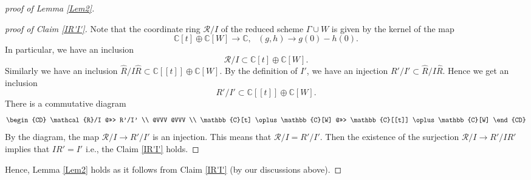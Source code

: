 \documentclass[12pt,a4paper]{amsart}
\theoremstyle{remark}
\theoremstyle{definition}
\def\C{\mathbb{C}}
\begin{document}
\begin{proof}[proof of Lemma \ref{Lem2}]
\begin{proof}[proof of Claim \ref{IR'I'}]
Note that the coordinate ring $\mathcal{R}/I$ of the reduced scheme $\Gamma \cup W$ is given by the kernel 
of the map $$\C[t] \oplus \C[W] \to \C, \:\:\: (g, h) \to g(0) - h(0).$$ In particular, we have an inclusion  
$$\mathcal{R}/I \subset \C[t] \oplus \C[W].$$ 
Similarly we have an inclusion $\hat{R}/I\hat{R} \subset \C[[t]] \oplus \C[W].$ 
By the definition of $I'$, we have an injection $R'/I' \subset \hat{R}/I\hat{R}$. Hence we get an inclusion 
$$R'/I' \subset \C[[t]] \oplus \C[W].$$
There is a commutative diagram 
\begin{equation} 
\begin{CD} 
\mathcal{R}/I @>>> R'/I' \\ 
@VVV @VVV \\  
\C[t] \oplus \C[W] @>>> \C[[t]] \oplus \C[W] 
\end{CD} 
\end{equation}
By the diagram, the map $\mathcal{R}/I \to R'/I'$ is an injection. This means that $\mathcal{R}/I = R'/I'$. Then the existence of 
the surjection $\mathcal{R}/I \to R'/IR'$ implies that $IR' = I'$ i.e., the Claim \ref{IR'I'} holds. \end{proof}
Hence, Lemma \ref{Lem2} holds as it follows from 
Claim \ref{IR'I'} (by our discussions above). 
\end{proof}


\end{document}
